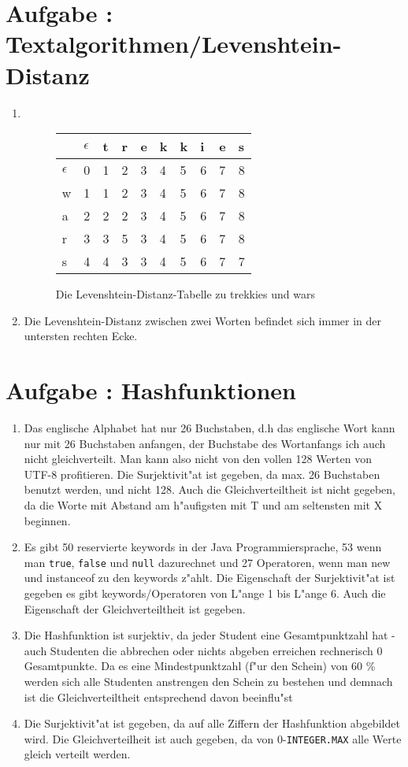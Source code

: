 \documentclass[12pt]{article}
\newcounter{exnum}
\newcommand{\aufgabe}[1]{\section*{Aufgabe \theexnum\stepcounter{exnum}: #1}} %
\begin{document}
\aufgabe{Textalgorithmen/Levenshtein-Distanz}
\begin{enumerate}
\item \text{}\\ 
\begin{figure}[!h]
\centering
\begin{tabular}{|l|l|l|l|l|l|l|l|l|l|}
\hline
  & $\epsilon$  & t & r & e & k & k & i & e & s \\ \hline
$\epsilon$  & 0 & 1 & 2 & 3 & 4 & 5 & 6 & 7 & 8 \\ \hline
w & 1 & 1 & 2 & 3 & 4 & 5 & 6 & 7 & 8 \\ \hline
a & 2 & 2 & 2 & 3 & 4 & 5 & 6 & 7 & 8 \\ \hline
r & 3 & 3 & 5 & 3 & 4 & 5 & 6 & 7 & 8 \\ \hline
s & 4 & 4 & 3 & 3 & 4 & 5 & 6 & 7 & 7 \\ \hline
\end{tabular}
\caption{Die Levenshtein-Distanz-Tabelle zu trekkies und wars}
\end{figure}
\item Die Levenshtein-Distanz zwischen zwei Worten befindet sich immer in der untersten rechten Ecke.
\end{enumerate}
\aufgabe{Hashfunktionen}
\begin{enumerate}
\item Das englische Alphabet hat nur 26 Buchstaben, d.h das englische Wort kann nur mit 26 Buchstaben anfangen, der Buchstabe des Wortanfangs ich auch nicht gleichverteilt. Man kann also nicht von den vollen 128 Werten von UTF-8 profitieren.
Die Surjektivit"at ist gegeben, da max. 26 Buchstaben benutzt werden, und nicht 128. Auch die Gleichverteiltheit ist nicht gegeben, da die Worte mit Abstand am h"aufigsten mit T und am seltensten mit X beginnen.


\item Es gibt 50 reservierte keywords in der Java Programmiersprache, 53 wenn man \verb|true|, \verb|false| und \verb|null| dazurechnet und 27 Operatoren, wenn man new und instanceof zu den keywords z"ahlt.
Die Eigenschaft der Surjektivit"at ist gegeben es gibt keywords/Operatoren von L"ange 1 bis L"ange 6.
Auch die Eigenschaft der Gleichverteiltheit ist gegeben. 


\item Die Hashfunktion ist surjektiv, da jeder Student eine Gesamtpunktzahl hat - auch Studenten die abbrechen oder nichts abgeben erreichen rechnerisch 0 Gesamtpunkte. Da es eine Mindestpunktzahl (f"ur den Schein) von 60 \% werden sich alle Studenten anstrengen den Schein zu bestehen und demnach ist die Gleichverteiltheit entsprechend davon beeinflu"st



\item Die Surjektivit"at ist gegeben, da auf alle Ziffern der Hashfunktion abgebildet wird.
Die Gleichverteilheit ist auch gegeben, da von 0-\verb|INTEGER.MAX| alle Werte gleich verteilt werden.
\end{enumerate}
\newpage
\end{document}

